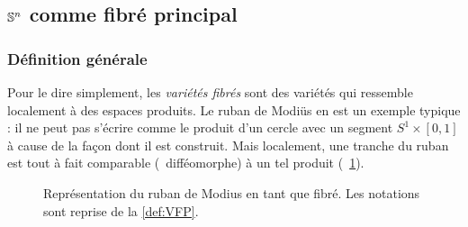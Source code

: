 \subsection{$\S{n}$ comme fibré principal} \label{subsec:VFP}

\subsubsection{Définition générale}\label{subsec:def2VFP}

Pour le dire simplement, les \emph{variétés fibrés} sont des variétés qui ressemble localement à des espaces produits. 
Le ruban de Modiüs en est un exemple typique : il ne peut pas s'écrire comme le produit d'un cercle avec un segment $S^{1}\times [0,1]$ à cause de la façon dont il est construit. Mais localement, une tranche du ruban est tout à fait comparable (\ie~difféomorphe) à un tel produit (\cf~\cref{fig:ruban2modius}).
\begin{figure}[h]
	
	\caption[Ruban de Mobius comme variété fibrée]{Représentation du ruban de Modius en tant que fibré. Les notations sont reprise de la \cref{def:VFP}.}
	\label{fig:ruban2modius}
\end{figure}
\skipl

